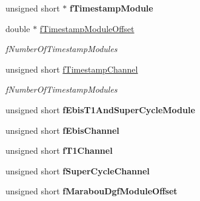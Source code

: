 \begin{DoxyCompactItemize}
\item 
\hypertarget{class_global_settings_a70bc89b24c2c6b9cc95090efd2c71c2e}{unsigned short $\ast$ {\bfseries f\-Timestamp\-Module}}\label{class_global_settings_a70bc89b24c2c6b9cc95090efd2c71c2e}

\item 
\hypertarget{class_global_settings_a97d325770bf95368ee70d0e336032cc6}{double $\ast$ \hyperlink{class_global_settings_a97d325770bf95368ee70d0e336032cc6}{f\-Timestamp\-Module\-Offset}}\label{class_global_settings_a97d325770bf95368ee70d0e336032cc6}

\begin{DoxyCompactList}\small\item\em f\-Number\-Of\-Timestamp\-Modules \end{DoxyCompactList}\item 
\hypertarget{class_global_settings_abc63389c34c21eba6a25723442e825a2}{unsigned short \hyperlink{class_global_settings_abc63389c34c21eba6a25723442e825a2}{f\-Timestamp\-Channel}}\label{class_global_settings_abc63389c34c21eba6a25723442e825a2}

\begin{DoxyCompactList}\small\item\em f\-Number\-Of\-Timestamp\-Modules \end{DoxyCompactList}\item 
\hypertarget{class_global_settings_a0f85aaa3aa19f24ab7b3b029feb19e89}{unsigned short {\bfseries f\-Ebis\-T1\-And\-Super\-Cycle\-Module}}\label{class_global_settings_a0f85aaa3aa19f24ab7b3b029feb19e89}

\item 
\hypertarget{class_global_settings_a1e0af52a3df16678c85730eb93eec4b8}{unsigned short {\bfseries f\-Ebis\-Channel}}\label{class_global_settings_a1e0af52a3df16678c85730eb93eec4b8}

\item 
\hypertarget{class_global_settings_a8342c6229c94c09f5cd7cb57c69227f1}{unsigned short {\bfseries f\-T1\-Channel}}\label{class_global_settings_a8342c6229c94c09f5cd7cb57c69227f1}

\item 
\hypertarget{class_global_settings_a151bdb446baeac778c83c3df8ff97c71}{unsigned short {\bfseries f\-Super\-Cycle\-Channel}}\label{class_global_settings_a151bdb446baeac778c83c3df8ff97c71}

\item 
\hypertarget{class_global_settings_ae4982fffd750facbbe9562801711b25f}{unsigned short {\bfseries f\-Marabou\-Dgf\-Module\-Offset}}\label{class_global_settings_ae4982fffd750facbbe9562801711b25f}


\end{DoxyCompactItemize}

